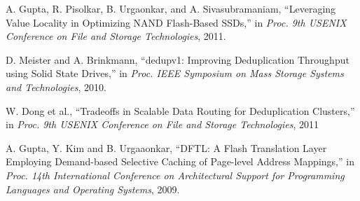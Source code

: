 \begin{thebibliography}{00}
A. Gupta, R. Pisolkar, B. Urgaonkar, and A. Sivasubramaniam,
``Leveraging Value Locality in Optimizing NAND Flash-Based SSDs,''
in \textit{Proc. 9th USENIX Conference on File and Storage Technologies}, 2011.

D. Meister and A. Brinkmann,
``dedupv1: Improving Deduplication Throughput using Solid State Drives,''
in \textit{Proc. IEEE Symposium on Mass Storage Systems and Technologies}, 2010.

W. Dong et al.,
``Tradeoffs in Scalable Data Routing for Deduplication Clusters,''
in \textit{Proc. 9th USENIX Conference on File and Storage Technologies}, 2011


A. Gupta, Y. Kim and B. Urgaaonkar, 
``DFTL: A Flash Translation Layer Employing Demand-based Selective Caching of Page-level Address Mappings,''
in \textit{Proc. 14th International Conference on Architectural Support for Programming Languages and
Operating Systems}, 2009.





\end{thebibliography}
